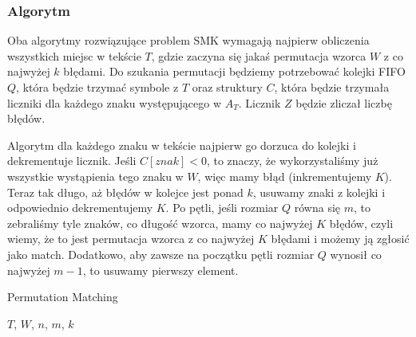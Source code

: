 \documentclass[a4paper,11pt]{article}
\newcommand{\algorithmicinput}{\textbf{input}}
\newcommand{\INPUT}{\item[\algorithmicinput]}
\begin{document}
\subsubsection*{Algorytm}
Oba algorytmy rozwiązujące problem SMK wymagają najpierw obliczenia wszystkich miejsc w tekście $T$, gdzie zaczyna się jakaś permutacja wzorca $W$ z co najwyżej $k$ błędami. Do szukania permutacji będziemy potrzebować kolejki FIFO $Q$, która będzie trzymać symbole z $T$ oraz struktury $C$, która będzie trzymała liczniki dla każdego znaku występującego w $A_T$. Licznik $Z$ będzie zliczał liczbę błędów.
\par
Algorytm dla każdego znaku w tekście najpierw go dorzuca do kolejki i dekrementuje licznik. Jeśli $C[znak] < 0$, to znaczy, że wykorzystaliśmy już wszystkie wystąpienia tego znaku w $W$, więc mamy błąd (inkrementujemy $K$). Teraz tak długo, aż błędów w kolejce jest ponad $k$, usuwamy znaki z kolejki i odpowiednio dekrementujemy $K$. Po pętli, jeśli rozmiar $Q$ równa się $m$, to zebraliśmy tyle znaków, co długość wzorca, mamy co najwyżej $K$ błędów, czyli wiemy, że to jest permutacja wzorca z co najwyżej $K$ błędami i możemy ją zgłosić jako match. Dodatkowo, aby zawsze na początku pętli rozmiar $Q$ wynosił co najwyżej $m-1$, to usuwamy pierwszy element.
\begin{algorithm}[H]
\caption{Permutation Matching}
\begin{algorithmic} 
\INPUT{$T$, $W$, $n$, $m$, $k$}
\ENDIF
{}
    \IF{$C[\tilde{T}j]] < 0$}
    \ENDIF\\
        \ENDIF
    \ENDWHILE
        \ENDIF
    \ENDIF
\ENDFOR
\end{algorithmic}
\end{algorithm}
\end{document}

